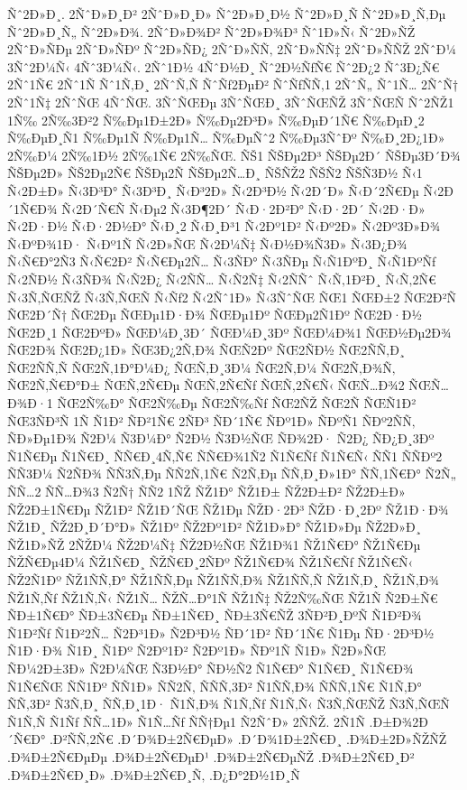 {Ñˆ2Ð»Ð¸.
2ÑˆÐ»Ð¸Ð²
2ÑˆÐ»Ð¸Ð»
Ñˆ2Ð»Ð¸Ð½
Ñˆ2Ð»Ð¸Ñ
Ñˆ2Ð»Ð¸Ñ‚Ðµ
Ñˆ2Ð»Ð¸Ñ„
Ñˆ2Ð»Ð¾.
2ÑˆÐ»Ð¾Ð²
Ñˆ2Ð»Ð¾Ð³
Ñˆ1Ð»Ñ‹
Ñˆ2Ð»ÑŽ
2ÑˆÐ»ÑÐµ
2ÑˆÐ»ÑÐº
Ñˆ2Ð»ÑÐ¿
2ÑˆÐ»ÑÑ‚
2ÑˆÐ»ÑÑ‡
2ÑˆÐ»ÑÑŽ
2ÑˆÐ¼
3Ñˆ2Ð¼Ñ‹
4Ñˆ3Ð¼Ñ‹.
2Ñˆ1Ð½
4ÑˆÐ½Ð¸
Ñˆ2Ð½ÑƒÑ€
Ñˆ2Ð¿2
Ñˆ3Ð¿Ñ€
2Ñˆ1Ñ€
2Ñˆ1Ñ
Ñˆ1Ñ‚Ð¸
2ÑˆÑ‚Ñ
ÑˆÑƒ2ÐµÐ²
ÑˆÑƒÑÑ‚1
2ÑˆÑ„
Ñˆ1Ñ…
2ÑˆÑ†
2Ñˆ1Ñ‡
2ÑˆÑŒ
4ÑˆÑŒ.
3ÑˆÑŒÐµ
3ÑˆÑŒÐ¸
3ÑˆÑŒÑŽ
3ÑˆÑŒÑ
Ñˆ2ÑŽ1
1Ñ‰
2Ñ‰3Ð²2
Ñ‰Ðµ1Ð±2Ð»
Ñ‰Ðµ2Ð³Ð»
Ñ‰ÐµÐ´1Ñ€
Ñ‰ÐµÐ¸2
Ñ‰ÐµÐ¸Ñ1
Ñ‰Ðµ1Ñ
Ñ‰Ðµ1Ñ…
Ñ‰ÐµÑˆ2
Ñ‰Ðµ3ÑˆÐº
Ñ‰Ð¸2Ð¿1Ð»
2Ñ‰Ð¼
2Ñ‰1Ð½
2Ñ‰1Ñ€
2Ñ‰ÑŒ.
ÑŠ1
ÑŠÐµ2Ð³
ÑŠÐµ2Ð´
ÑŠÐµ3Ð´Ð¾
ÑŠÐµ2Ð»
ÑŠ2Ðµ2Ñ€
ÑŠÐµ2Ñ
ÑŠÐµ2Ñ…Ð¸
ÑŠÑŽ2
ÑŠÑ2
ÑŠÑ3Ð½
Ñ‹1
Ñ‹2Ð±Ð»
Ñ‹3Ð³Ð°
Ñ‹3Ð³Ð¸
Ñ‹Ð³2Ð»
Ñ‹2Ð³Ð½
Ñ‹2Ð´Ð»
Ñ‹Ð´2Ñ€Ðµ
Ñ‹2Ð´1Ñ€Ð¾
Ñ‹2Ð´Ñ€Ñ
Ñ‹Ðµ2
Ñ‹3Ð¶2Ð´
Ñ‹Ð·2Ð²Ð°
Ñ‹Ð·2Ð´
Ñ‹2Ð·Ð»
Ñ‹2Ð·Ð½
Ñ‹Ð·2Ð½Ð°
Ñ‹Ð¸2
Ñ‹Ð¸Ð³1
Ñ‹2Ðº1Ð²
Ñ‹Ðº2Ð»
Ñ‹2Ðº3Ð»Ð¾
Ñ‹ÐºÐ¾1Ð·
Ñ‹Ðº1Ñ
Ñ‹2Ð»ÑŒ
Ñ‹2Ð¼Ñ‡
Ñ‹Ð½Ð¾Ñ3Ð»
Ñ‹3Ð¿Ð¾
Ñ‹Ñ€Ð°2Ñ3
Ñ‹Ñ€2Ð²
Ñ‹Ñ€Ðµ2Ñ…
Ñ‹3ÑÐ°
Ñ‹3ÑÐµ
Ñ‹Ñ1ÐºÐ¸
Ñ‹Ñ1ÐºÑƒ
Ñ‹2ÑÐ½
Ñ‹3ÑÐ¾
Ñ‹Ñ2Ð¿
Ñ‹2ÑÑ…
Ñ‹Ñ2Ñ‡
Ñ‹2ÑÑˆ
Ñ‹Ñ‚1Ð²Ð¸
Ñ‹Ñ‚2Ñ€
Ñ‹3Ñ‚ÑŒÑŽ
Ñ‹3Ñ‚ÑŒÑ
Ñ‹Ñƒ2
Ñ‹2Ñˆ1Ð»
Ñ‹3ÑˆÑŒ
ÑŒ1
ÑŒÐ±2
ÑŒ2Ð²Ñ
ÑŒ2Ð´Ñ†
ÑŒ2Ðµ
ÑŒÐµ1Ð·Ð¾
ÑŒÐµ1Ðº
ÑŒÐµ2Ñ1Ðº
ÑŒ2Ð·Ð½
ÑŒ2Ð¸1
ÑŒ2ÐºÐ»
ÑŒÐ¼Ð¸3Ð´
ÑŒÐ¼Ð¸3Ðº
ÑŒÐ¼Ð¾1
ÑŒÐ½Ðµ2Ð¾
ÑŒ2Ð¾
ÑŒ2Ð¿1Ð»
ÑŒ3Ð¿2Ñ‚Ð¾
ÑŒÑ2Ðº
ÑŒ2ÑÐ½
ÑŒ2ÑÑ‚Ð¸
ÑŒ2ÑÑ‚Ñ
ÑŒ2Ñ‚1Ð°Ð¼Ð¿
ÑŒÑ‚Ð¸3Ð¼
ÑŒ2Ñ‚Ð¼
ÑŒ2Ñ‚Ð¾Ñ‚
ÑŒ2Ñ‚Ñ€Ð°Ð±
ÑŒÑ‚2Ñ€Ðµ
ÑŒÑ‚2Ñ€Ñƒ
ÑŒÑ‚2Ñ€Ñ‹
ÑŒÑ…Ð¾2
ÑŒÑ…Ð¾Ð·1
ÑŒ2Ñ‰Ð°
ÑŒ2Ñ‰Ðµ
ÑŒ2Ñ‰Ñƒ
ÑŒ2ÑŽ
ÑŒ2Ñ
ÑŒÑ1Ð²
ÑŒ3ÑÐ³Ñ
1Ñ
Ñ1Ð²
ÑÐ²1Ñ€
2ÑÐ³
ÑÐ´1Ñ€
ÑÐº1Ð»
ÑÐºÑ1
ÑÐº2ÑÑ‚
ÑÐ»Ðµ1Ð¾
Ñ2Ð¼
Ñ3Ð¼Ð°
Ñ2Ð½
Ñ3Ð½ÑŒ
ÑÐ¾2Ð·
Ñ2Ð¿
ÑÐ¿Ð¸3Ðº
Ñ1Ñ€Ðµ
Ñ1Ñ€Ð¸
ÑÑ€Ð¸4Ñ‚Ñ€
ÑÑ€Ð¾1Ñ2
Ñ1Ñ€Ñƒ
Ñ1Ñ€Ñ‹
ÑÑ1
ÑÑÐº2
ÑÑ3Ð¼
Ñ2ÑÐ¾
ÑÑ3Ñ‚Ðµ
ÑÑ2Ñ‚1Ñ€
Ñ2Ñ‚Ðµ
ÑÑ‚Ð¸Ð»1Ð°
ÑÑ‚1Ñ€Ð°
Ñ2Ñ„
ÑÑ…2
ÑÑ…Ð¾3
Ñ2Ñ†
ÑÑ2
1ÑŽ
ÑŽ1Ð°
ÑŽ1Ð±
ÑŽ2Ð±Ð²
ÑŽ2Ð±Ð»
ÑŽ2Ð±1Ñ€Ðµ
ÑŽ1Ð²
ÑŽ1Ð´ÑŒ
ÑŽ1Ðµ
ÑŽÐ·2Ð³
ÑŽÐ·Ð¸2Ðº
ÑŽ1Ð·Ð¾
ÑŽ1Ð¸
ÑŽ2Ð¸Ð´Ð°Ð»
ÑŽ1Ðº
ÑŽ2Ðº1Ð²
ÑŽ1Ð»Ð°
ÑŽ1Ð»Ðµ
ÑŽ2Ð»Ð¸
ÑŽ1Ð»ÑŽ
2ÑŽÐ¼
ÑŽ2Ð¼Ñ‡
ÑŽ2Ð½ÑŒ
ÑŽ1Ð¾1
ÑŽ1Ñ€Ð°
ÑŽ1Ñ€Ðµ
ÑŽÑ€Ðµ4Ð¼
ÑŽ1Ñ€Ð¸
ÑŽÑ€Ð¸2ÑÐº
ÑŽ1Ñ€Ð¾
ÑŽ1Ñ€Ñƒ
ÑŽ1Ñ€Ñ‹
ÑŽ2Ñ1Ðº
ÑŽ1ÑÑ‚Ð°
ÑŽ1ÑÑ‚Ðµ
ÑŽ1ÑÑ‚Ð¾
ÑŽ1ÑÑ‚Ñ
ÑŽ1Ñ‚Ð¸
ÑŽ1Ñ‚Ð¾
ÑŽ1Ñ‚Ñƒ
ÑŽ1Ñ‚Ñ‹
ÑŽ1Ñ…
ÑŽÑ…Ð°1Ñ
ÑŽ1Ñ‡
ÑŽ2Ñ‰ÑŒ
ÑŽ1Ñ
Ñ2Ð±Ñ€
ÑÐ±1Ñ€Ð°
ÑÐ±3Ñ€Ðµ
ÑÐ±1Ñ€Ð¸
ÑÐ±3Ñ€ÑŽ
3ÑÐ²Ð¸ÐºÑ
Ñ1Ð²Ð¾
Ñ1Ð²Ñƒ
Ñ1Ð²2Ñ…
Ñ2Ð³1Ð»
Ñ2Ð³Ð½
ÑÐ´1Ð²
ÑÐ´1Ñ€
Ñ1Ðµ
ÑÐ·2Ð³Ð½
Ñ1Ð·Ð¾
Ñ1Ð¸
Ñ1Ðº
Ñ2Ðº1Ð²
Ñ2Ðº1Ð»
ÑÐº1Ñ
Ñ1Ð»
Ñ2Ð»ÑŒ
ÑÐ¼2Ð±3Ð»
Ñ2Ð¼ÑŒ
Ñ3Ð½Ð°
ÑÐ½Ñ2
Ñ1Ñ€Ð°
Ñ1Ñ€Ð¸
Ñ1Ñ€Ð¾
Ñ1Ñ€ÑŒ
ÑÑ1Ðº
ÑÑ1Ð»
ÑÑ2Ñ‚
ÑÑÑ‚3Ð²
Ñ1ÑÑ‚Ð¾
ÑÑÑ‚1Ñ€
Ñ1Ñ‚Ð°
ÑÑ‚3Ð²
Ñ3Ñ‚Ð¸
ÑÑ‚Ð¸1Ð·
Ñ1Ñ‚Ð¾
Ñ1Ñ‚Ñƒ
Ñ1Ñ‚Ñ‹
Ñ3Ñ‚ÑŒÑŽ
Ñ3Ñ‚ÑŒÑ
Ñ1Ñ‚Ñ
Ñ1Ñƒ
ÑÑ…1Ð»
Ñ1Ñ…Ñƒ
ÑÑ†Ðµ1
Ñ2ÑˆÐ»
2ÑÑŽ.
2Ñ1Ñ
%
.Ð±Ð¾2Ð´Ñ€Ð°
.Ð²ÑÑ‚2Ñ€
.Ð´Ð¾Ð±2Ñ€ÐµÐ»
.Ð´Ð¾1Ð±2Ñ€Ð¸
.Ð¾Ð±2Ð»ÑŽÑŽ
.Ð¾Ð±2Ñ€ÐµÐµ
.Ð¾Ð±2Ñ€ÐµÐ¹
.Ð¾Ð±2Ñ€ÐµÑŽ
.Ð¾Ð±2Ñ€Ð¸Ð²
.Ð¾Ð±2Ñ€Ð¸Ð»
.Ð¾Ð±2Ñ€Ð¸Ñ‚
.Ð¿Ð°2Ð½1Ð¸Ñ
}
